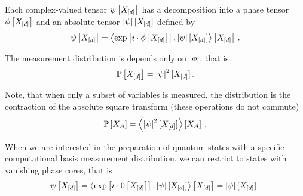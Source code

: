 Each complex-valued tensor $\psi\left[X_{[d]}\right]$ has a decomposition into a phase tensor $\phi\left[X_{[d]}\right]$ and an absolute tensor $\left|\psi\right|[X_{[d]}]$ defined by
\begin{align*}
    \psi\left[X_{[d]}\right] = \left\langle \mathrm{exp}\left[i\cdot\phi\left[X_{[d]}\right]\right], \left|\psi\right|[X_{[d]}]\right\rangle \left[ X_{[d]} \right]\, .
\end{align*}

The measurement distribution is depends only on $\left|\phi\right|$, that is
\begin{align*}
    \mathbb{P}\left[X_{[d]}\right] = \left|\psi\right|^2[X_{[d]}] \, .
\end{align*}

Note, that when only a subset of variables is measured, the distribution is the contraction of the absolute square transform (these operations do not commute)
\begin{align*}
    \mathbb{P}\left[X_{A}\right] = \left\langle \left|\psi\right|^2[X_{[d]}]\right\rangle \left[ X_{A} \right] \, .
\end{align*}

When we are interested in the preparation of quantum states with a specific computational basis measurement distribution, we can restrict to states with vanishing phase cores, that is
\begin{align*}
    \psi\left[X_{[d]}\right]
    = \left\langle \mathrm{exp}\left[i\cdot0\left[X_{[d]}\right]\right], \left|\psi\right|[X_{[d]}]\right\rangle \left[ X_{[d]} \right]
    = \left|\psi\right|[X_{[d]}]  \, .
\end{align*}